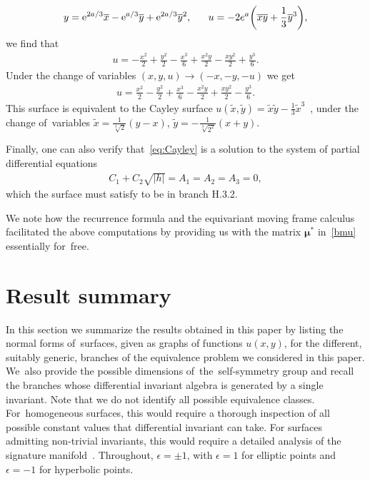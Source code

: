 \documentclass[10pt,a4paper]{amsart}
\numberwithin{equation}{section}
\newcommand{\ox}{\overline{x}}
\newcommand{\oy}{\overline{y}}
\begin{document}
\begin{Example}
\begin{gather*}
y = {\rm e}^{2a/3}\ox-{\rm e}^{a/3}\oy + {\rm e}^{2a/3}\oy^2,\quad\ \
u= -2e^a\bigg(\ox\oy+\frac{1}{3}\oy^3\bigg),
\end{gather*}
we find that
\begin{gather*}
u = -\frac{x^2}{2}+\frac{y^2}{2}-\frac{x^3}{6}+\frac{x^2y}{2}-\frac{xy^2}{2}+\frac{y^3}{6}.
\end{gather*}
Under the change of variables $(x,y,u)\to(-x,-y,-u)$ we get
%
\begin{gather}\label{eq:Cayley}
u = \frac{x^2}{2}-\frac{y^2}{2}+\frac{x^3}{6}-\frac{x^2y}{2}+\frac{xy^2}{2}-\frac{y^3}{6}.
\end{gather}
%
This surface is equivalent to the Cayley surface $u(\widetilde{x},\widetilde{y})=\widetilde{x}\widetilde{y} - \frac{1}{3}\widetilde{x}^3$~\cite{NS-1994}, under the change of~vari\-ables $\widetilde{x} = \frac{1}{\sqrt[3]{2}}(y-x)$, $\widetilde{y} = -\frac{1}{\sqrt[3]{2^2}}(x+y)$.

Finally, one can also verify that~\eqref{eq:Cayley} is a solution to the system of partial differential equations
\begin{gather*}
C_1 + C_2\sqrt{|h|}=A_1=A_2=A_3=0,
\end{gather*}
which the surface must satisfy to be in branch H.3.2.
\end{Example}

\begin{Remark}We note how the recurrence formula and the equivariant moving frame calculus facilitated the above computations by providing us with the matrix $\bm{\mu}^*$ in~\eqref{bmu} essentially for~free.
\end{Remark}

\section{Result summary}\label{sec:summary}

In this section we summarize the results obtained in this paper by listing the normal forms of~surfaces, given as graphs of functions $u(x,y)$, for the different, suitably generic, branches of the equivalence problem we considered in this paper. We~also provide the possible dimensions of~the~self-symmetry group and recall the branches whose differential invariant algebra is gene\-ra\-ted by a single invariant. Note that we do not identify all possible equivalence classes. For~homo\-geneous surfaces, this would require a thorough inspection of all possible constant values that differential invariant can take. For surfaces admitting non-trivial invariants, this would require a detailed analysis of the signature manifold~\cite{O-1995}. Throughout, $\epsilon=\pm 1$, with $\epsilon=1$ for elliptic points and $\epsilon=-1$ for hyperbolic points.
\end{document}
